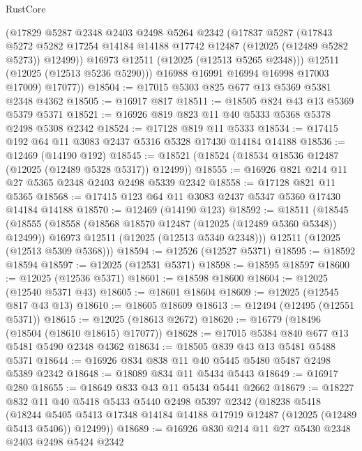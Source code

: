 \begin{lexlean}{RustCore}
\begin{coremodule}
            (@17829
              @5287
              @2348
              @2403
              @2498
              @5264
              @2342
              (@17837
                @5287
                (@17843
                  @5272
                  @5282
                  @17254
                  @14184
                  @14188
                  @17742
                  @12487
                  (@12025 (@12489 @5282 @5273))
                  @12499))
              @16973
              @12511
              (@12025 (@12513 @5265 @2348)))
            @12511
            (@12025 (@12513 @5236 @5290)))
          @16988
          @16991
          @16994
          @16998
          @17003
          @17009)
        @17077))
@18504 := @17015 @5303 @825 @677 @13 @5369 @5381 @2348 @4362
@18505 := @16917 @817
@18511 := @18505 @824 @43 @13 @5369 @5379 @5371
@18521 := @16926 @819 @823 @11 @40 @5333 @5368 @5378 @2498 @5308 @2342
@18524 := @17128 @819 @11 @5333
@18534 := @17415 @192 @64 @11 @3083 @2437 @5316 @5328 @17430 @14184 @14188
@18536 := @12469 (@14190 @192)
@18545 := @18521 (@18524 (@18534 @18536 @12487 (@12025 (@12489 @5328 @5317)) @12499))
@18555 := @16926 @821 @214 @11 @27 @5365 @2348 @2403 @2498 @5339 @2342
@18558 := @17128 @821 @11 @5365
@18568 := @17415 @123 @64 @11 @3083 @2437 @5347 @5360 @17430 @14184 @14188
@18570 := @12469 (@14190 @123)
@18592 := @18511
    (@18545
      (@18555
        (@18558 (@18568 @18570 @12487 (@12025 (@12489 @5360 @5348)) @12499))
        @16973
        @12511
        (@12025 (@12513 @5340 @2348)))
      @12511
      (@12025 (@12513 @5309 @5368)))
@18594 := @12526 (@12527 @5371)
@18595 := @18592 @18594
@18597 := @12025 (@12531 @5371)
@18598 := @18595 @18597
@18600 := @12025 (@12536 @5371)
@18601 := @18598 @18600
@18604 := @12025 (@12540 @5371 @43)
@18605 := @18601 @18604
@18609 := @12025 (@12545 @817 @43 @13)
@18610 := @18605 @18609
@18613 := @12494 (@12495 (@12551 @5371))
@18615 := @12025 (@18613 @2672)
@18620 := @16779 (@18496 (@18504 (@18610 @18615) @17077))
@18628 := @17015 @5384 @840 @677 @13 @5481 @5490 @2348 @4362
@18634 := @18505 @839 @43 @13 @5481 @5488 @5371
@18644 := @16926 @834 @838 @11 @40 @5445 @5480 @5487 @2498 @5389 @2342
@18648 := @18089 @834 @11 @5434 @5443
@18649 := @16917 @280
@18655 := @18649 @833 @43 @11 @5434 @5441 @2662
@18679 := @18227
    @832
    @11
    @40
    @5418
    @5433
    @5440
    @2498
    @5397
    @2342
    (@18238
      @5418
      (@18244 @5405 @5413 @17348 @14184 @14188 @17919 @12487 (@12025 (@12489 @5413 @5406)) @12499))
@18689 := @16926 @830 @214 @11 @27 @5430 @2348 @2403 @2498 @5424 @2342

\end{coremodule}
\end{lexlean}
